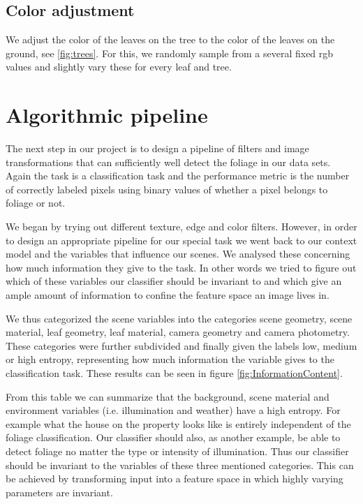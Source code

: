 \documentclass[fleqn,10pt]{SelfArx} %
\begin{document}
\subsection{Color adjustment}
We adjust the color of the leaves on the tree to the color of the leaves on the ground, see \ref{fig:trees}. For this, we randomly sample from a several fixed rgb values and slightly vary these for every leaf and tree. 

\section{Algorithmic pipeline}

The next step in our project is to design a pipeline of filters and image transformations that can sufficiently well detect the foliage in our data sets. Again the task is a classification task and the performance metric is the number of correctly labeled pixels using binary values of whether a pixel belongs to foliage or not.

We began by trying out different texture, edge and color filters. However, in order to design an appropriate pipeline for our special task we went back to our context model and the variables that influence our scenes. We analysed these concerning how much information they give to the task. In other words we tried to figure out which of these variables our classifier should be invariant to and which give an ample amount of information to confine the feature space an image lives in.

We thus categorized the scene variables into the categories scene geometry, scene material, leaf geometry, leaf material, camera geometry and camera photometry. These categories were further subdivided and finally given the labels low, medium or high entropy, representing how much information the variable gives to the classification task. 
These results can be seen in figure \ref{fig:InformationContent}.

From this table we can summarize that the background, scene material and environment variables (i.e. illumination and weather) have a high entropy. For example what the house on the property looks like is entirely independent of the foliage classification. Our classifier should also, as another example, be able to detect foliage no matter the type or intensity of illumination. Thus our classifier should be invariant to the variables of these three mentioned categories. This can be achieved by transforming input into a feature space in which highly varying parameters are invariant.
\end{document}
